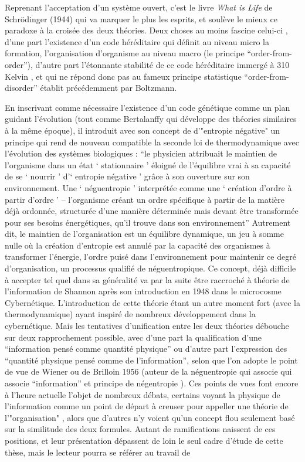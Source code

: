 Reprenant l'acceptation d'un système ouvert, c'est le livre \textit{What is Life} de Schrödinger (1944) qui va marquer le plus les esprits, et soulève le mieux ce paradoxe à la croisée des deux théories. Deux choses au moins fascine celui-ci \autocite{Foerster1959}, d'une part l'existence d'un code héréditaire qui définit au niveau micro la formation, l'organisation d'organisme au niveau macro (le principe \enquote{order-from-order}), d'autre part l'étonnante stabilité de ce code héréditaire immergé à 310 Kelvin \autocite[47]{Schrodinger1944}, et qui ne répond donc pas au fameux principe statistique \enquote{order-from-disorder} établit précédemment par Boltzmann.

En inscrivant comme nécessaire l'existence d'un code génétique comme un plan guidant l'évolution (tout comme Bertalanffy qui développe des théories similaires à la même époque), il introduit avec son concept de d'"entropie négative" un principe qui rend de nouveau compatible la seconde loi de thermodynamique avec l'évolution des systèmes biologiques : \enquote{le physicien attribuait le maintien de l’organisme dans un état \enquote{ stationnaire } éloigné de l’équilibre vrai à sa capacité de se \enquote{ nourrir } d’\enquote{ entropie négative } grâce à son ouverture sur son environnement. Une \enquote{ néguentropie } interprétée comme une \enquote{ création d’ordre à partir d’ordre } -- l’organisme créant un ordre spécifique à partir de la matière déjà ordonnée, structurée d’une manière déterminée mais devant être transformée pour ses besoins énergétiques, qu’il trouve dans son environnement} \autocite[502]{Pouvreau2013} Autrement dit, le maintien de l'organisation est un équilibre dynamique, un jeu à somme nulle où la création d'entropie est annulé par la capacité des organismes à transformer l'énergie, l'ordre puisé dans l'environnement pour maintenir ce degré d'organisation, un processus qualifié de néguentropique. Ce concept, déjà difficile à accepter tel quel dans sa généralité \autocite[225]{Lemoigne1977} va par la suite être raccroché à théorie de l'information de Shannon après son introduction en 1948 dans le microcosme Cybernétique. L'introduction de cette théorie étant un autre moment fort (avec la thermodynamique) ayant inspiré de nombreux développement dans la cybernétique. Mais les tentatives d'unification entre les deux théories débouche sur deux rapprochement possible, avec d'une part la qualification d'une \enquote{information pensé comme quantité physique} ou d'autre part l'expression des \enquote{quantité physique pensé comme de l'information}, selon que l'on adopte le point de vue de Wiener ou de Brilloin 1956 (auteur de la néguentropie qui associe qui associe \enquote{information} et principe de négentropie ). Ces points de vues font encore à l'heure actuelle l'objet de nombreux débats, certains voyant la physique de l'information comme un point de départ à creuser pour appeller une théorie de l'"organisation" \autocite[37-38]{Morin2005}, alors que d'autres n'y voient qu'un concept flou seulement basé sur la similitude des deux formules. Autant de ramifications naissent de ces positions, et leur présentation dépassent de loin le seul cadre d'étude de cette thèse, mais le lecteur pourra se référer au travail de 